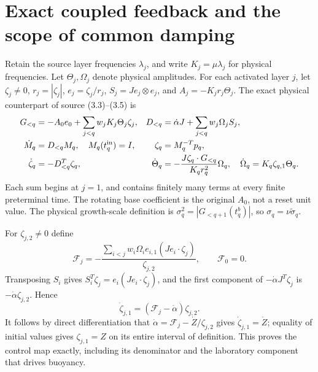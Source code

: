 \section{Exact coupled feedback and the scope of common damping}
\label{cvlane:sec:feedback}
Retain the source layer frequencies $\lambda_j$, and write
$K_j=\mu\lambda_j$ for physical frequencies. Let $\Theta_j,
\Omega_j$ denote physical amplitudes. For each activated layer
$j$, let $\zeta_j\ne0$, $r_j=|\zeta_j|$, $e_j=\zeta_j/r_j$,
$S_j=Je_j\otimes e_j$, and $A_j=-K_jr_j\Theta_j$.
The exact physical counterpart of source (3.3)--(3.5) is
\begin{align}
 G_{<q}&=-A_0e_0+\sum_{j<q}w_jK_j\Theta_j\zeta_j,
 &D_{<q}&=\dot\alpha J+\sum_{j<q}w_j\Omega_jS_j,\notag\\
 \dot M_q&=D_{<q}M_q,\quad M_q(t_q^{\rm in})=I,
 &\zeta_q&=M_q^{-T}p_q,\notag\\
 \dot\zeta_q&=-D_{<q}^T\zeta_q,
 &\dot\Theta_q&=-\frac{J\zeta_q\cdot G_{<q}}{K_qr_q^2}\Omega_q,
 \quad\dot\Omega_q=K_q\zeta_{q,1}\Theta_q.
 \label{cvlane:eq:physicalcoupled}
\end{align}
Each sum begins at $j=1$, and contains finitely many terms at
every finite preterminal time. The rotating base coefficient
is the original $A_0$, not a reset unit value. The physical
growth-scale definition is $\sigma_q^2=|G_{<q+1}(t_q^b)|$,
so $\sigma_q=\nu\widetilde\sigma_q$.

For $\zeta_{j,2}\ne0$ define
\begin{equation}
 \mathcal F_j=-\frac{\sum_{i<j}w_i\Omega_i e_{i,1}
 (Je_i\cdot\zeta_j)}{\zeta_{j,2}},\qquad \mathcal F_0=0.
 \label{cvlane:eq:physicalfeedback}
\end{equation}
Transposing $S_i$ gives
$S_i^T\zeta_j=e_i(Je_i\cdot\zeta_j)$, and the first
component of $-\dot\alpha J^T\zeta_j$ is
$-\dot\alpha\zeta_{j,2}$. Hence
\begin{equation}
 \dot\zeta_{j,1}=(\mathcal F_j-\dot\alpha)\zeta_{j,2}.
 \label{cvlane:eq:controlledcomponent}
\end{equation}
It follows by direct differentiation that
$\dot\alpha=\mathcal F_j-\dot Z/\zeta_{j,2}$ gives
$\dot\zeta_{j,1}=\dot Z$; equality of initial values gives
$\zeta_{j,1}=Z$ on its entire interval of definition.
This proves the control map exactly, including its denominator
and the laboratory component that drives buoyancy.

